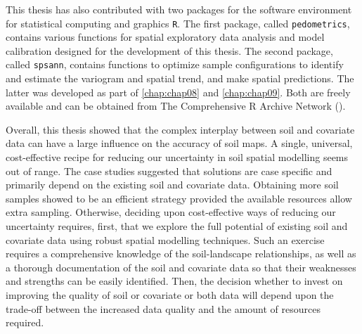 This thesis has also contributed with two packages for the software environment for statistical computing and 
graphics \texttt{R}. The first package, called \texttt{pedometrics}, contains various functions for spatial 
exploratory data analysis and model calibration designed for the development of this thesis. The second 
package, called \texttt{spsann}, contains functions to optimize sample configurations to identify and estimate 
the variogram and spatial trend, and make spatial predictions. The latter was developed as part of 
\autoref{chap:chap08} and \autoref{chap:chap09}. Both are freely available and can be obtained from The 
Comprehensive R Archive Network (\cran).

Overall, this thesis showed that the complex interplay between soil and covariate data can have a large 
influence on the accuracy of soil maps. A single, universal, cost-effective recipe for reducing our uncertainty 
in soil spatial modelling seems out of range. The case studies suggested that solutions are case specific and 
primarily depend on the existing soil and covariate data. Obtaining more soil samples showed to be an efficient 
strategy provided the available resources allow extra sampling. Otherwise, deciding upon cost-effective ways of 
reducing our uncertainty requires, first, that we explore the full potential of existing soil and covariate 
data using robust spatial modelling techniques. Such an exercise requires a comprehensive knowledge of the 
soil-landscape relationships, as well as a thorough documentation of the soil and covariate data so that their 
weaknesses and strengths can be easily identified. Then, the decision whether to invest on improving the 
quality of soil or covariate or both data will depend upon the trade-off between the increased data quality and 
the amount of resources required.
